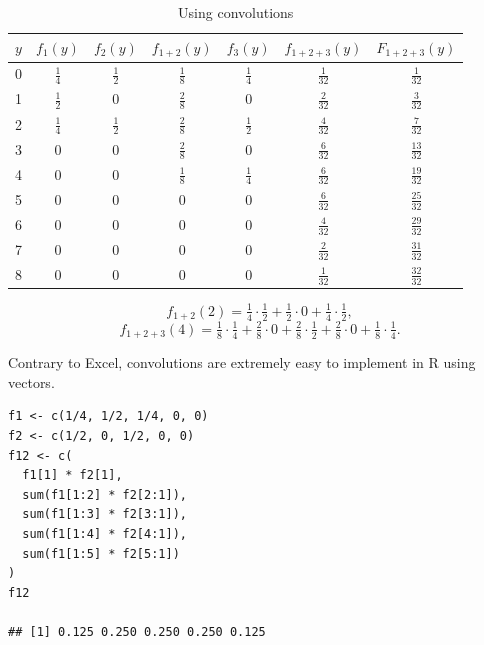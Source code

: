 \documentclass[11pt]{article}
\newcommand{\noi}{\noindent}
\begin{document}
\noi
\begin{table}[ht]
\centering
\caption{Using convolutions}
\vspace{0.5em}
\begin{tabular}{|c|c|c|c|c|c|c|}
\hline
\(y\) & \(f_1(y)\) & \(f_2(y)\) & \(f_{1+2}(y)\) & \(f_3(y)\) & \(f_{1+2+3}(y)\) & \(F_{1+2+3}(y)\) \\
\hline
0 & \(\tfrac{1}{4}\) & \(\tfrac{1}{2}\) & \(\tfrac{1}{8}\) & \(\tfrac{1}{4}\) & \(\tfrac{1}{32}\) & \(\tfrac{1}{32}\) \\
1 & \(\tfrac{1}{2}\) & 0 & \(\tfrac{2}{8}\) & 0 & \(\tfrac{2}{32}\) & \(\tfrac{3}{32}\) \\
2 & \(\tfrac{1}{4}\) & \(\tfrac{1}{2}\) & \(\tfrac{2}{8}\) & \(\tfrac{1}{2}\) & \(\tfrac{4}{32}\) & \(\tfrac{7}{32}\) \\
3 & 0 & 0 & \(\tfrac{2}{8}\) & 0 & \(\tfrac{6}{32}\) & \(\tfrac{13}{32}\) \\
4 & 0 & 0 & \(\tfrac{1}{8}\) & \(\tfrac{1}{4}\) & \(\tfrac{6}{32}\) & \(\tfrac{19}{32}\) \\
5 & 0 & 0 & 0 & 0 & \(\tfrac{6}{32}\) & \(\tfrac{25}{32}\) \\
6 & 0 & 0 & 0 & 0 & \(\tfrac{4}{32}\) & \(\tfrac{29}{32}\) \\
7 & 0 & 0 & 0 & 0 & \(\tfrac{2}{32}\) & \(\tfrac{31}{32}\) \\
8 & 0 & 0 & 0 & 0 & \(\tfrac{1}{32}\) & \(\tfrac{32}{32}\) \\
\hline
\end{tabular}
\end{table}

\[
f_{1+2}(2)
= \tfrac{1}{4}\cdot\tfrac{1}{2}
+ \tfrac{1}{2}\cdot 0
+ \tfrac{1}{4}\cdot\tfrac{1}{2},
\]
\[
f_{1+2+3}(4)
= \tfrac{1}{8}\cdot\tfrac{1}{4}
+ \tfrac{2}{8}\cdot 0
+ \tfrac{2}{8}\cdot\tfrac{1}{2}
+ \tfrac{2}{8}\cdot 0
+ \tfrac{1}{8}\cdot\tfrac{1}{4}.
\]

\noi Contrary to Excel, convolutions are extremely easy to implement in R using vectors.

\begin{lstlisting}
f1 <- c(1/4, 1/2, 1/4, 0, 0)
f2 <- c(1/2, 0, 1/2, 0, 0)
f12 <- c(
  f1[1] * f2[1],
  sum(f1[1:2] * f2[2:1]),
  sum(f1[1:3] * f2[3:1]),
  sum(f1[1:4] * f2[4:1]),
  sum(f1[1:5] * f2[5:1])
)
f12

## [1] 0.125 0.250 0.250 0.250 0.125
\end{lstlisting}
\end{document}
